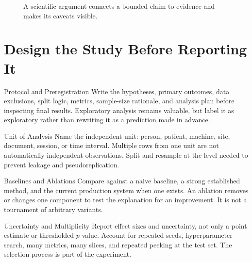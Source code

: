 \begin{figure}[htbp]
\centering
{}
\caption{A scientific argument connects a bounded claim to evidence and makes
its caveats visible.}
\label{fig:scientific-claim-evidence-caveat}
\end{figure}

\section{Design the Study Before Reporting It}

\begin{v3topic}{Protocol and Preregistration}
Write the hypotheses, primary outcomes, data exclusions, split logic, metrics,
sample-size rationale, and analysis plan before inspecting final results.
Exploratory analysis remains valuable, but label it as exploratory rather than
rewriting it as a prediction made in advance.

\end{v3topic}
\begin{v3topic}{Unit of Analysis}
Name the independent unit: person, patient, machine, site, document, session,
or time interval.
Multiple rows from one unit are not automatically independent observations.
Split and resample at the level needed to prevent leakage and
pseudoreplication.

\end{v3topic}
\begin{v3topic}{Baselines and Ablations}
Compare against a naive baseline, a strong established method, and the current
production system when one exists.
An ablation removes or changes one component to test the explanation for an
improvement.
It is not a tournament of arbitrary variants.

\end{v3topic}
\begin{v3topic}{Uncertainty and Multiplicity}
Report effect sizes and uncertainty, not only a point estimate or thresholded
$p$-value.
Account for repeated seeds, hyperparameter search, many metrics, many slices,
and repeated peeking at the test set.
The selection process is part of the experiment.
\end{v3topic}

